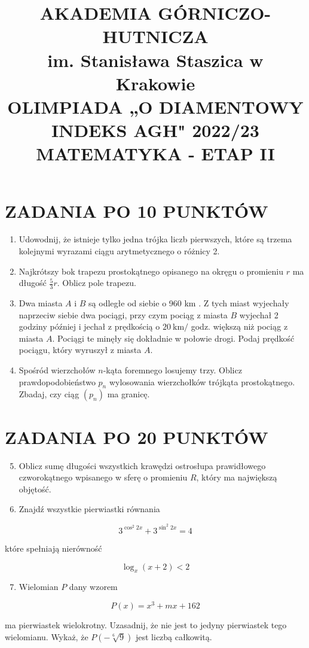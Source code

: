 \documentclass[10pt]{article}
\title{AKADEMIA GÓRNICZO-HUTNICZA \\
 im. Stanisława Staszica w Krakowie \\
 OLIMPIADA „O DIAMENTOWY INDEKS AGH" 2022/23 \\
 MATEMATYKA - ETAP II }
\author{}
\date{}
\begin{document}
\maketitle
\section*{ZADANIA PO 10 PUNKTÓW}
\begin{enumerate}
  \item Udowodnij, że istnieje tylko jedna trójka liczb pierwszych, które są trzema kolejnymi wyrazami ciągu arytmetycznego o różnicy 2.
  \item Najkrótszy bok trapezu prostokątnego opisanego na okręgu o promieniu $r$ ma długość $\frac{5}{3} r$. Oblicz pole trapezu.
  \item Dwa miasta $A$ i $B$ są odległe od siebie o 960 km . Z tych miast wyjechały naprzeciw siebie dwa pociągi, przy czym pociąg z miasta $B$ wyjechał 2 godziny później i jechał z prędkością o $20 \mathrm{~km} /$ godz. większą niż pociąg z miasta $A$. Pociągi te minęły się dokładnie w połowie drogi. Podaj prędkość pociągu, który wyruszył z miasta $A$.
  \item Spośród wierzchołów $n$-kąta foremnego losujemy trzy. Oblicz prawdopodobieństwo $p_{n}$ wylosowania wierzchołków trójkąta prostokątnego. Zbadaj, czy ciąg $\left(p_{n}\right)$ ma granicę.
\end{enumerate}

\section*{ZADANIA PO 20 PUNKTÓW}
\begin{enumerate}
  \setcounter{enumi}{4}
  \item Oblicz sumę długości wszystkich krawędzi ostrosłupa prawidłowego czworokątnego wpisanego w sferę o promieniu $R$, który ma największą objętość.
  \item Znajdź wszystkie pierwiastki równania
\end{enumerate}

$$
3^{\cos ^{2} 2 x}+3^{\sin ^{2} 2 x}=4
$$

które spełniają nierówność

$$
\log _{x}(x+2)<2
$$

\begin{enumerate}
  \setcounter{enumi}{6}
  \item Wielomian $P$ dany wzorem
\end{enumerate}

$$
P(x)=x^{3}+m x+162
$$

ma pierwiastek wielokrotny. Uzasadnij, że nie jest to jedyny pierwiastek tego wielomianu. Wykaż, że $P(-\sqrt[6]{9})$ jest liczbą całkowitą.
\end{document}
